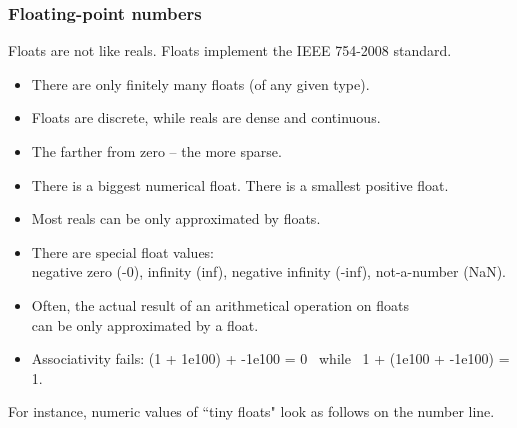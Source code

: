 \documentclass[aspectratio=169,xcolor=pdftex,dvipsnames]{beamer} %
\begin{document}
\begin{frame}
\frametitle{Floating-point numbers}

Floats are not like reals. Floats implement the IEEE 754-2008 standard.

\begin{itemize}
\item
There are only finitely many floats (of any given type). 
\item
Floats are discrete, while reals are dense and continuous.
\item
The farther from zero -- the more sparse.
\item
There is a biggest numerical float. 
There is a smallest positive float.
\item
Most reals can be only approximated by floats.
\item
There are special float values:\\
 negative zero (-0), infinity (inf), negative infinity (-inf), not-a-number (NaN).
 \item
Often, the actual result of an arithmetical operation on floats\\
 can be only approximated by a float.
\item 
Associativity fails:
(1 + 1e100) + -1e100 = 0 \  while \  1 + (1e100 + -1e100) = 1.
\end{itemize}
For instance, numeric values of ``tiny floats" look as follows on the number line.
\end{frame}
\end{document}
